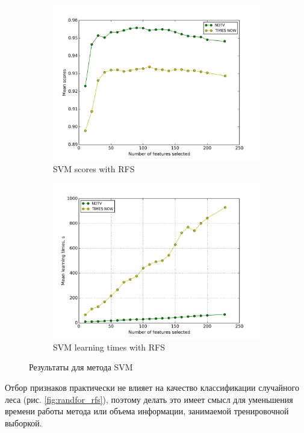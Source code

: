\begin{figure}[h!]
    \centering
	\begin{subfigure}{0.45\textwidth}
		\includegraphics[width=\textwidth]{images/RFS-SVM.png}
		\caption{SVM scores with RFS}
	\end{subfigure}
	\begin{subfigure}{0.45\textwidth}
		\includegraphics[width=\textwidth]{images/RFS-SVMTime.png}
		\caption{SVM learning times with RFS}
	\end{subfigure}
	\caption{Результаты для метода SVM}\label{fig:svm_rfs}
\end{figure}

\par
Отбор признаков практически не влияет на качество классификации случайного леса (рис. \ref{fig:randfor_rfs}), поэтому делать это имеет  смысл для уменьшения времени работы метода или объема информации, занимаемой тренировочной выборкой.

